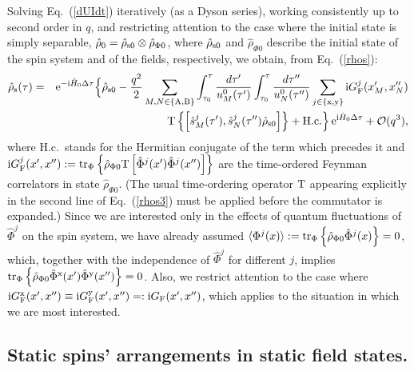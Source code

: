 \documentclass[]{nature}
\begin{document}
Solving Eq.~(\ref{dUIdt}) iteratively (as a Dyson series),
working consistently up to second order in $q$, and  restricting attention to the case where the initial state is simply separable, $\hat\rho_0 = \hat\rho_{\rm s0}\otimes \hat\rho_{\Phi 0}$, where
$\hat\rho_{\rm s0}$ and   $\hat\rho_{\Phi 0}$ describe the initial state of the spin system and of the fields, respectively, we obtain, from Eq.~(\ref{rhos}): 
\begin{eqnarray}
\hat \rho_{\rm s}(\tau) &=& {\rm e}^{-{\rm i}\hat H_0 \Delta \tau}\Big\{\hat \rho_{\rm s0}
-\frac{q^2}{2}\sum_{
\tiny{{M},{N}\in\{{\rm A},{\rm B}\}}
}
\int_{\tau_0}^\tau \frac{d\tau'}{u_{M}^0(\tau')} \int_{\tau_0}^\tau \frac{d\tau''}{u_{N}^0(\tau '')} 
\sum_{{ j}\in\{{\rm x},{\rm y}\}}
{\rm i} G^j_{\rm F}(x_{M}',x_{N}'')
\nonumber \\
& &\hskip 1.5cm
{\rm T}\left\{\left[\hat s_{M}^j(\tau'),
\hat s_{N}^j(\tau'')\hat \rho_{\rm s0} \right]\right\}
+{\rm H.c.}\Big\}\,{\rm e}^{{\rm i}\hat H_0 \Delta \tau}
+ {\cal O} (q^3),
 \label{rhos3}
\end{eqnarray}
where H.c.\ stands for the Hermitian conjugate of the term which precedes it
and ${\rm i}G^j_{\rm F}(x',x'') := {\rm tr}_\Phi\left\{\hat \rho_{\Phi 0}{\rm T}\left[\hat \Phi^j (x') \hat \Phi^j(x'')\right]\right\}$ are the 
time-ordered Feynman correlators  in
state $\hat \rho_{\Phi 0}$.  (The 
usual time-ordering operator ${\rm T}$ appearing explicitly in the second line of Eq.~(\ref{rhos3}) must be applied before
 the commutator is expanded.) Since we are interested only in the effects of quantum fluctuations of $\hat \Phi^j$ on the spin system, we 
have already assumed 
$\langle\Phi^j(x)\rangle := {\rm tr}_\Phi\left\{\hat \rho_{\Phi0} \hat\Phi^j(x)\right\} = 0$, which, together with the independence of $\hat \Phi^j$ for different $j$, implies
${\rm tr}_\Phi\left\{\hat \rho_{\Phi 0}\hat \Phi^{\rm x} (x') \hat \Phi^{\rm y}(x'')\right\}=0$. Also, we restrict attention to the case where
 ${\rm i}G^{\rm x}_{\rm F}(x',x'') \equiv {\rm i}G^{\rm y}_{\rm F}(x',x'')=:{\rm i}G_{\rm F}(x',x'')$, which applies to the situation  in which  we are most interested.


\subsection{Static spins' arrangements in static field states.}
\end{document}
